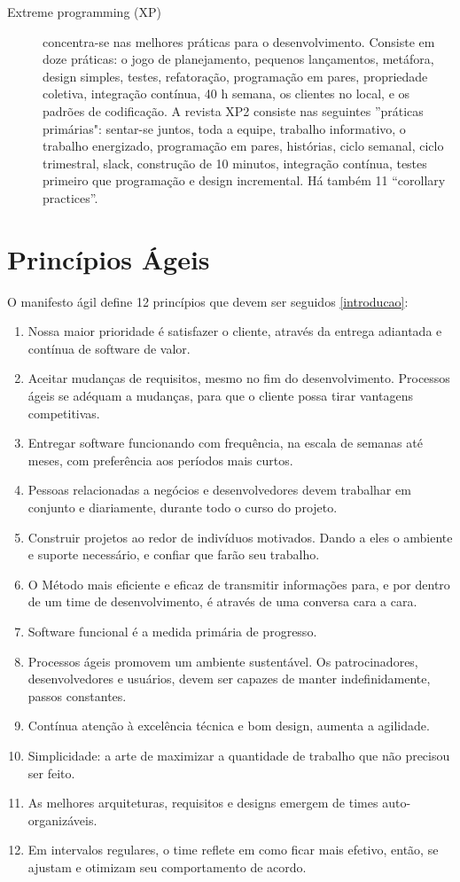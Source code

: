 \begin{description}
\item [Extreme programming (XP)]
concentra-se nas melhores práticas para o desenvolvimento.  Consiste em doze práticas: o jogo de planejamento, pequenos lançamentos,  metáfora, design simples, testes, refatoração, programação em pares,  propriedade coletiva, integração contínua, 40 h semana, os clientes no local,  e os padrões de codificação. A revista XP2 consiste nas seguintes  ''práticas primárias": sentar-se juntos, toda a equipe, trabalho informativo,  o trabalho energizado, programação em pares, histórias, ciclo semanal,  ciclo trimestral, slack, construção de 10 minutos, integração contínua,  testes primeiro que programação e design incremental.  Há também 11 ``corollary practices''.
\end{description}

\section{Princípios Ágeis}
\label{principios-ageis}
O manifesto ágil define 12 princípios que devem ser seguidos \ref{introducao}:
%
\begin{enumerate}
\item Nossa maior prioridade é satisfazer o cliente, através da entrega adiantada e contínua de software de valor.
\item Aceitar mudanças de requisitos, mesmo no fim do desenvolvimento. Processos ágeis se adéquam a mudanças, para que o cliente possa tirar vantagens competitivas.
\item Entregar software funcionando com frequência, na escala de semanas até meses, com preferência aos períodos mais curtos.
\item Pessoas relacionadas a negócios e desenvolvedores devem trabalhar em conjunto e diariamente, durante todo o curso do projeto.
\item Construir projetos ao redor de indivíduos motivados. Dando a eles o ambiente e suporte necessário, e confiar que farão seu trabalho.
\item O Método mais eficiente e eficaz de transmitir informações para, e por dentro de um time de desenvolvimento, é através de uma conversa cara a cara.
\item Software funcional é a medida primária de progresso.
\item Processos ágeis promovem um ambiente sustentável. Os patrocinadores, desenvolvedores e usuários, devem ser capazes de manter indefinidamente, passos constantes.
\item Contínua atenção à excelência técnica e bom design, aumenta a agilidade.
\item Simplicidade: a arte de maximizar a quantidade de trabalho que não precisou ser feito.
\item As melhores arquiteturas, requisitos e designs emergem de times auto-organizáveis.
\item Em intervalos regulares, o time reflete em como ficar mais efetivo, então, se ajustam e otimizam seu comportamento de acordo.
\end{enumerate}

